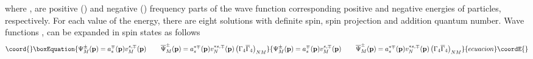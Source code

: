 \documentclass[a4paper,12pt]{article}
\begin{document}
where \coordHE{}, \coordHE{}
are positive (\coordHE{}) and negative (\coordHE{}) frequency parts of the wave function
corresponding positive \coordHE{} and negative \coordHE{} energies of
particles, respectively. For each value of the energy, there are
eight solutions with definite spin, spin projection and addition
quantum number. Wave functions \coordHE{}, \coordHE{} can be expanded in spin
states as follows
\begin{equation}\coord{}\boxEquation{
\Psi _M^{\pm }(\mathbf{p})=a_s^{\mp }(\mathbf{p})v_M^{s,\mp
}(\mathbf{p}) \hspace{0.3in}\overline{\Psi }_M^{\pm
}(\mathbf{p})=a_s^{*\mp }(\mathbf{p} )v_N^{*s,\mp
}(\mathbf{p})\left( \Gamma _4\overline{\Gamma }_4\right) _{NM}
\label{67}
}{
\Psi _M^{\pm }(\mathbf{p})=a_s^{\mp }(\mathbf{p})v_M^{s,\mp
}(\mathbf{p}) \hspace{0.3in}\overline{\Psi }_M^{\pm
}(\mathbf{p})=a_s^{*\mp }(\mathbf{p} )v_N^{*s,\mp
}(\mathbf{p})\left( \Gamma _4\overline{\Gamma }_4\right) _{NM}
}{ecuacion}\coordE{}\end{equation}
\end{document}
